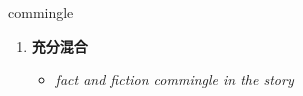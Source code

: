 
\begin{frame}
{\huge commingle}
\begin{center}
\begin{enumerate}\Large
  \item \textbf{充分混合}
  \begin{itemize}
    \item \em{\Large{fact and fiction commingle in the story}}
  \end{itemize}
\end{enumerate}
\end{center}
\end{frame}
